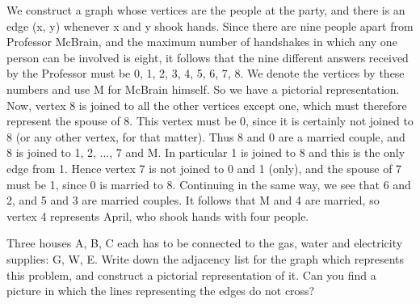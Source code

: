 \begin{questions}
\begin{solution}
\begin{center}
\begin{adjustbox}{max width=0.6\textwidth}
		\end{adjustbox}
		\end{center}

	
  	We construct a graph whose vertices are the people at the party, and there is an edge (x, y) whenever x and y shook hands.
  	Since there are nine people apart from Professor McBrain, and the maximum number of handshakes in which any one person can be involved is eight, it follows that the nine different answers received by the Professor must be 0, 1, 2, 3, 4, 5, 6, 7, 8.
  	We denote the vertices by these numbers and use M for McBrain himself.
  	So we have a pictorial representation.
  	Now, vertex 8 is joined to all the other vertices except one, which must therefore represent the spouse of 8.
  	This vertex must be 0, since it is certainly not joined to 8 (or any other vertex, for that matter).
  	Thus 8 and 0 are a married couple, and 8 is joined to 1, 2, ..., 7 and M.
  	In particular 1 is joined to 8 and this is the only edge from 1.
  	Hence vertex 7 is not joined to 0 and 1 (only), and the spouse of 7 must be 1, since 0 is married to 8.
  	Continuing in the same way, we see that 6 and 2, and 5 and 3 are married couples.
  	It follows that M and 4 are married, so vertex 4 represents April, who shook hands with four people.
  \end{solution}

\question
  Three houses A, B, C each has to be connected to the gas, water and electricity supplies: G, W, E.
  Write down the adjacency list for the graph which represents this problem, and construct a pictorial representation of it.
  Can you find a picture in which the lines representing the edges do not cross?~\cite{biggs02}
	\begin{solution}
		

\end{solution}
\end{questions}
